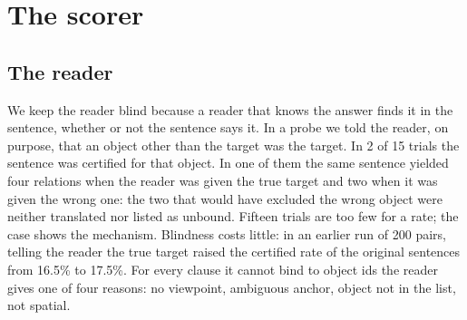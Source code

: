 \section{The scorer}
\label{supp:scorer}
\subsection{The reader}
\label{supp:reader}
We keep the reader blind because a reader that knows the answer finds it in the sentence, whether or not the sentence says it.
In a probe we told the reader, on purpose, that an object other than the target was the target.
In 2 of 15 trials the sentence was certified for that object.
In one of them the same sentence yielded four relations when the reader was given the true target and two when it was given the wrong one: the two that would have excluded the wrong object were neither translated nor listed as unbound.
Fifteen trials are too few for a rate; the case shows the mechanism.
Blindness costs little: in an earlier run of 200 pairs, telling the reader the true target raised the certified rate of the original sentences from 16.5\% to 17.5\%.
For every clause it cannot bind to object ids the reader gives one of four reasons: no viewpoint, ambiguous anchor, object not in the list, not spatial.

